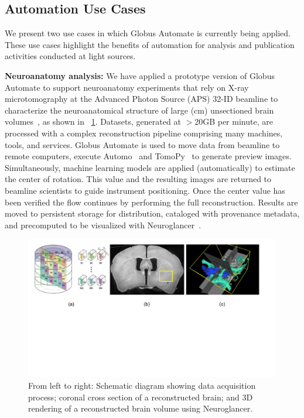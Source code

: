 \documentclass{aip-cp}
\begin{document}
\subsection{Automation Use Cases}

We present two use cases in which Globus Automate is currently being applied. These
use cases highlight the benefits of automation for analysis and publication activities
conducted at light sources.

\textbf{Neuroanatomy analysis:} We have applied a prototype version of Globus Automate
to support neuroanatomy experiments that rely on
X-ray microtomography at the Advanced Photon Source (APS) 32-ID beamline to
characterize the neuroanatomical structure of large (cm) unsectioned brain 
volumes~\cite{kasthuri2015saturated}, as shown in \figurename{~\ref{fig:brains}}. 
Datasets, generated at $>$20GB per minute, are processed
with a complex reconstruction pipeline 
comprising many machines, tools, and services.  
Globus Automate is used to move data from beamline to remote computers,
execute Automo~\cite{Automo} and TomoPy~\cite{gursoy2014tomopy} 
to generate preview images. Simultaneously, machine learning models
are applied (automatically) to estimate the center of rotation. This value and the resulting 
images are returned to beamline scientists to guide instrument positioning. Once the center value 
has been verified the flow continues by performing the full reconstruction. Results are moved to 
persistent storage for distribution, cataloged with
provenance metadata, and precomputed to be visualized with Neuroglancer~\cite{Neuroglancer}. 

\begin{figure}[t!]
	\centering
	\includegraphics[trim={0.7cm 8.6cm 1.5cm 0cm},clip,width=0.99\textwidth]{Figs/brains.pdf}
	\caption{From left to right: Schematic diagram showing data acquisition process;
	coronal cross section of a reconstructed brain; and
	3D rendering of a reconstructed brain volume using Neuroglancer.}
	\label{fig:brains}
\end{figure}
\end{document}
